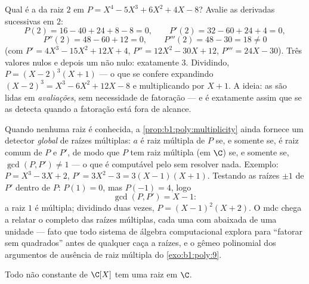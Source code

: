 \begin{example}\label{ex:b1:poly:multexample}
Qual é a  da raiz $2$ em $P = X^4 - 5X^3 + 6X^2
+ 4X - 8$? Avalie as derivadas sucessivas em $2$:
\[
P(2) = 16 - 40 + 24 + 8 - 8 = 0, \qquad
P'(2) = 32 - 60 + 24 + 4 = 0,
\]
\[
P''(2) = 48 - 60 + 12 = 0, \qquad
P'''(2) = 48 - 30 = 18 \neq 0
\]
(com $P' = 4X^3 - 15X^2 + 12X + 4$, $P'' = 12X^2 - 30X + 12$,
$P''' = 24X - 30$). Três valores nulos e depois um não nulo:
 exatamente $3$. Dividindo, $P = (X - 2)^3(X + 1)$ ---
o que se confere expandindo $(X-2)^3 = X^3 - 6X^2 + 12X - 8$ e
multiplicando por $X + 1$. A ideia: as  são lidas em
\emph{avaliações}, sem necessidade de fatoração --- e é exatamente
assim que se as detecta quando a fatoração está fora de alcance.
\end{example}

\begin{example}\label{ex:b1:poly:gcdmultiple}
Quando nenhuma raiz é conhecida, a \cref{prop:b1:poly:multiplicity} ainda
fornece um detector \emph{global} de raízes múltiplas: $a$ é raiz
múltipla de $P$ se, e somente se, é raiz comum de $P$ e $P'$, de modo
que $P$ tem raiz múltipla (em $\C$) se, e somente se, $\gcd(P, P') \neq 1$ ---
o que é computável pelo  sem resolver nada.
Exemplo: $P =
X^3 - 3X + 2$, $P' = 3X^2 - 3 = 3(X - 1)(X + 1)$. Testando as
raízes $\pm1$ de $P'$ dentro de $P$: $P(1) = 0$, mas $P(-1) = 4$, logo
\[
\gcd(P, P') = X - 1 :
\]
a raiz $1$ é múltipla; dividindo duas vezes, $P = (X - 1)^2(X + 2)$.
O mdc chega a relatar o  completo das raízes múltiplas, cada uma
com  abaixada de uma unidade --- fato que todo sistema de
álgebra computacional explora para ``fatorar sem quadrados'' antes de
qualquer caça a raízes, e o gêmeo polinomial dos argumentos de ausência
de raiz múltipla do \cref{exo:b1:poly:9}.
\end{example}

\begin{theorem}\label{thm:b1:poly:fta}
Todo  não constante de $\C[X]$ tem uma raiz em
$\C$.
\end{theorem}
\admitted

